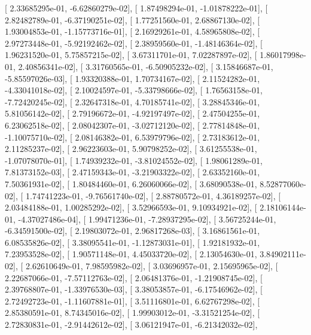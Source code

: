 \documentclass{article}
\begin{document}
       [  2.33685295e-01,  -6.62860279e-02],
       [  1.87498294e-01,  -1.01878222e-01],
       [  2.82482789e-01,  -6.37190251e-02],
       [  1.77251560e-01,   2.68867130e-02],
       [  1.93004853e-01,  -1.15773716e-01],
       [  2.16929261e-01,   4.58965808e-02],
       [  2.97273448e-01,  -5.92192462e-02],
       [  2.38959560e-01,  -1.48146364e-02],
       [  1.96231520e-01,   5.75857215e-02],
       [  3.67311701e-01,   7.02287897e-02],
       [  1.86017998e-01,   2.40856341e-02],
       [  3.31760565e-01,  -6.50905232e-02],
       [  3.15846687e-01,  -5.85597026e-03],
       [  1.93320388e-01,   1.70734167e-02],
       [  2.11524282e-01,  -4.33041018e-02],
       [  2.10024597e-01,  -5.33798666e-02],
       [  1.76563158e-01,  -7.72420245e-02],
       [  2.32647318e-01,   4.70185741e-02],
       [  3.28845346e-01,   5.81056142e-02],
       [  2.79196672e-01,  -4.92197497e-02],
       [  2.47504255e-01,   6.23062518e-02],
       [  2.08042307e-01,  -3.02712120e-02],
       [  2.77814848e-01,  -1.10075710e-02],
       [  2.08146382e-01,   6.53979796e-02],
       [  2.73183612e-01,   2.11285237e-02],
       [  2.96223603e-01,   5.90798252e-02],
       [  3.61255538e-01,  -1.07078070e-01],
       [  1.74939232e-01,  -3.81024552e-02],
       [  1.98061289e-01,   7.81373152e-03],
       [  2.47159343e-01,  -3.21903322e-02],
       [  2.63352160e-01,   7.50361931e-02],
       [  1.80484460e-01,   6.26060066e-02],
       [  3.68090538e-01,   8.52877060e-02],
       [  1.74741223e-01,  -9.76561740e-02],
       [  2.88780572e-01,   4.36189257e-02],
       [  2.03484188e-01,   1.00285292e-02],
       [  3.52966593e-01,   9.10934921e-02],
       [  2.18106144e-01,  -4.37027486e-04],
       [  1.99471236e-01,  -7.28937295e-02],
       [  3.56725244e-01,  -6.34591500e-02],
       [  2.19803072e-01,   2.96817268e-03],
       [  3.16861561e-01,   6.08535826e-02],
       [  3.38095541e-01,  -1.12873031e-01],
       [  1.92181932e-01,   7.23953528e-02],
       [  1.90571148e-01,   4.45033720e-02],
       [  2.13054630e-01,   3.84902111e-02],
       [  2.62610649e-01,   7.98595982e-02],
       [  3.03696957e-01,   2.15695965e-02],
       [  2.22687066e-01,  -7.57112763e-02],
       [  2.06481376e-01,  -1.21908745e-02],
       [  2.39768807e-01,  -1.33976530e-03],
       [  3.38053857e-01,  -6.17546962e-02],
       [  2.72492723e-01,  -1.11607881e-01],
       [  3.51116801e-01,   6.62767298e-02],
       [  2.85380591e-01,   8.74345016e-02],
       [  1.99903012e-01,  -3.31521254e-02],
       [  2.72830831e-01,  -2.91442612e-02],
       [  3.06121947e-01,  -6.21342032e-02],
\end{document}
